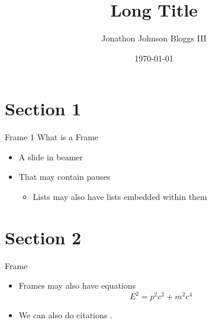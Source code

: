 \documentclass[pdf, fleqn, compress]{beamer}
\title[Short Title]{Long Title}
\author[J. Bloggs]{Jonathon Johnson Bloggs III}
\institute{Institution (Probably York)}
\date{\today}
\begin{document}
\begin{nonavigation}

\begin{frame}
    \titlepage
\end{frame}

\end{nonavigation}


\section{Section 1}

\begin{frame}{Frame 1}
	What is a Frame
	\begin{itemize}
		\item A slide in beamer
		\pause
		\item That may contain pauses
		\begin{itemize}
			\item Lists may also have lists embedded within them
		\end{itemize}
	\end{itemize}
\end{frame}

\section{Section 2}

\begin{frame}{Frame}
	\begin{itemize}
		\item Frames may also have equations
		\begin{equation}
			E^2 = p^2 c^2 + m^2 c^4
		\end{equation}
		\item We can also do citations \cite{knuth1986computers}.
	\end{itemize}
\end{frame}
\end{document}
